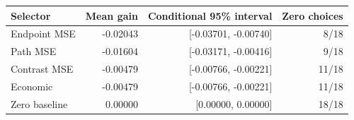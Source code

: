 \begin{tabular}{lrrr}
\toprule
Selector & Mean gain & Conditional 95\% interval & Zero choices \\
\midrule
Endpoint MSE & -0.02043 & [-0.03701, -0.00740] & 8/18 \\
Path MSE & -0.01604 & [-0.03171, -0.00416] & 9/18 \\
Contrast MSE & -0.00479 & [-0.00766, -0.00221] & 11/18 \\
Economic & -0.00479 & [-0.00766, -0.00221] & 11/18 \\
Zero baseline & 0.00000 & [0.00000, 0.00000] & 18/18 \\
\bottomrule
\end{tabular}
